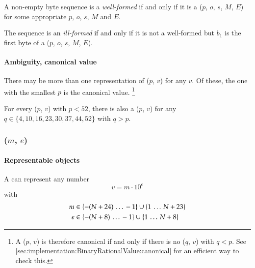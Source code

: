 A non-empty byte sequence  is a \emph{well-formed}
\DborBinaryRationalValue{} if and only if
it is a \DborBinaryRationalToken*($p$, $o$, $s$, $M$, $E$) for some appropriate $p$, $o$, $s$, $M$ and $E$.

The sequence is an \emph{ill-formed} \DborBinaryRationalValue{} if and only if it is not a well-formed
\DborBinaryRationalValue{} but $b_1$ is the first byte of a
\DborBinaryRationalToken*($p$, $o$, $s$, $M$, $E$).

\paragraph{Ambiguity, canonical value}

There may be more than one representation of \DborBinaryRationalValue($p$, $v$) for any $v$.
Of these, the one with the smallest $p$ is the canonical value.%
\footnote{
    A \DborBinaryRationalValue($p$, $v$) is therefore canonical if and only if there is
    no \DborBinaryRationalValue($q$, $v$) with $q < p$.
    See \ref{sec:implementation:BinaryRationalValue:canonical} for an efficient way to check this.
}

For every \DborBinaryRationalValue($p$, $v$) with $p < 52$, there is also
a \DborBinaryRationalValue($p$, $v$) for any
$q \in \{4, 10, 16, 23, 30, 37, 44, 52\}$ with $q > p$.


\subsubsection{\DborDecimalRationalValue(\texorpdfstring{$m$, $e$}{m, e})}
\hypertarget{sec:def:DecimalRationalValue}{}

\paragraph{Representable objects}

A \DborDecimalRationalValue{} can represent any number
\begin{equation}
    v = m \cdot 10^e
\end{equation}
with
\begin{align*}
    m & \in \{-(N + 24) \,\ldots\, -1\} \cup \{1 \,\ldots\, N + 23\} \\
    e & \in \{-(N + 8) \,\ldots\, -1\} \cup \{1 \,\ldots\, N + 8\}
\end{align*}

